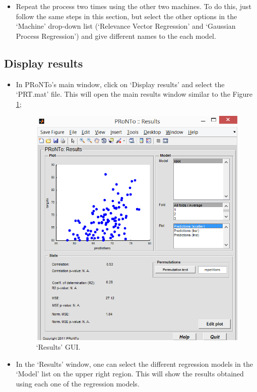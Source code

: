 \begin{itemize}
    \item Repeat the process two times using the other two machines. To do this, just follow the same steps in this section, but select the other options in the `Machine' drop-down list (`Relevance Vector Regression' and `Gaussian Process Regression') and give different names to the each model.

\end{itemize}


\subsection{Display results}
\label{sec:display_results_reg}
\begin{itemize}

    \item In PRoNTo's main window, click on `Display results' and select the `PRT.mat' file. This will open the main results window similar to the Figure \ref{fig:resultsReg};

        \begin{figure}[h!]
            \begin{center}
                \includegraphics[scale=0.75]{images/Tutorial/regression/resultsReg.png}
            \end{center}
            \caption{`Results' GUI.}
            \label{fig:resultsReg}
        \end{figure}

    \item In the `Results' window, one can select the different regression models in the `Model' list on the upper right region. This will show the results obtained using each one of the regression models.
\end{itemize}


